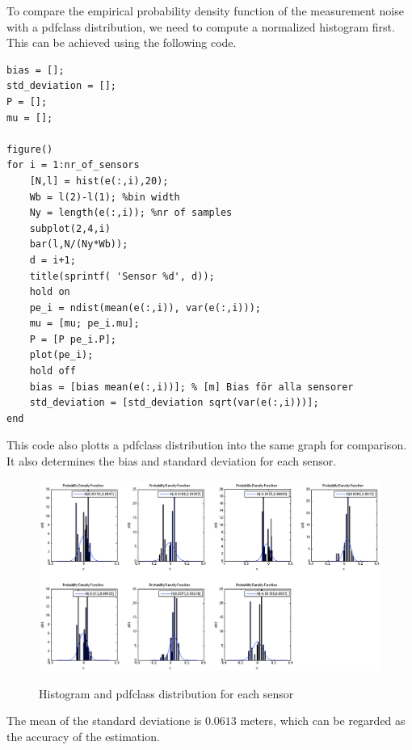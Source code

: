 \documentclass[10pt,a4paper]{report}
\begin{document}
To compare the empirical probability density function of the measurement noise with a pdfclass distribution, we need to compute a normalized histogram first. This can be achieved using the following code.
\begin{verbatim}
bias = [];
std_deviation = [];
P = [];
mu = [];

figure()
for i = 1:nr_of_sensors
    [N,l] = hist(e(:,i),20);
    Wb = l(2)-l(1); %bin width
    Ny = length(e(:,i)); %nr of samples
    subplot(2,4,i)
    bar(l,N/(Ny*Wb));
    d = i+1;
    title(sprintf( 'Sensor %d', d));
    hold on
    pe_i = ndist(mean(e(:,i)), var(e(:,i)));
    mu = [mu; pe_i.mu];
    P = [P pe_i.P];
    plot(pe_i);
    hold off
    bias = [bias mean(e(:,i))]; % [m] Bias för alla sensorer
    std_deviation = [std_deviation sqrt(var(e(:,i)))];
end
\end{verbatim}
This code also plotts a pdfclass distribution into the same graph for comparison. It also determines the bias and standard deviation for each sensor. 
\begin{figure}[H]
\begin{center}
  \label{histogram}
  \includegraphics[width = 350pt]{histogram.png}
  \caption{Histogram and pdfclass distribution for each sensor}
  \end{center}
\end{figure}
The mean of the standard deviatione is $0.0613$ meters, which can be regarded as the accuracy of the estimation.



\newpage
\end{document}
